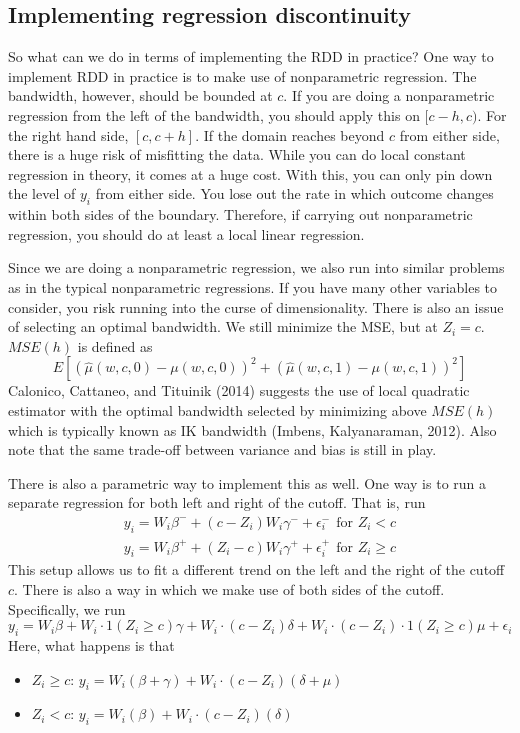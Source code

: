 \documentclass[12pt]{article}
\theoremstyle{definition}
\theoremstyle{property}
\theoremstyle{assumption}
\theoremstyle{example}
\theoremstyle{comment}
\begin{document}
\subsection{Implementing regression discontinuity}
So what can we do in terms of implementing the RDD in practice? One way to implement RDD in practice is to make use of nonparametric regression. The bandwidth, however, should be bounded at $c$. If you are doing a nonparametric regression from the left of the bandwidth, you should apply this on $[c-h, c)$. For the right hand side, $[c, c+h]$. If the domain reaches beyond $c$ from either side, there is a huge risk of misfitting the data. While you can do local constant regression in theory, it comes at a huge cost. With this, you can only pin down the level of $y_i$ from either side. You lose out the rate in which outcome changes within both sides of the boundary. Therefore, if carrying out nonparametric regression, you should do at least a local linear regression. \par
Since we are doing a nonparametric regression, we also run into similar problems as in the typical nonparametric regressions. If you have many other variables to consider, you risk running into the curse of dimensionality. There is also an issue of selecting an optimal bandwidth. We still minimize the MSE, but at $Z_i=c$.  $MSE(h)$ is defined as 
\[
E[(\hat{\mu}(w,c,0)-\mu(w,c,0))^2+(\hat{\mu}(w,c,1)-\mu(w,c,1))^2]
\]
Calonico, Cattaneo, and Tituinik (2014) suggests the use of local quadratic estimator with the optimal bandwidth selected by minimizing above $MSE(h)$ which is typically known as IK bandwidth (Imbens, Kalyanaraman, 2012). Also note that the same trade-off between variance and bias is still in play. \par
There is also a parametric way to implement this as well. One way is to run a separate regression for both left and right of the cutoff. That is, run
\begin{gather*}
y_i = W_i\beta^- +(c-Z_i)W_i\gamma^-+\epsilon_i^-\ \ \text{for }Z_i<c\\
y_i = W_i\beta^+ +(Z_i-c)W_i\gamma^++\epsilon_i^+\ \ \text{for }Z_i\geq c
\end{gather*}
This setup allows us to fit a different trend on the left and the right of the cutoff $c$. There is also a way in which we make use of both sides of the cutoff. Specifically, we run
\[
y_i = W_i\beta+ W_i \cdot 1(Z_i\geq c)\gamma+W_i\cdot(c-Z_i)\delta+W_i\cdot (c-Z_i)\cdot 1(Z_i\geq c) \mu +\epsilon_i
\]
Here, what happens is that
\begin{itemize}
\item $Z_i\geq c$: $y_i=W_i(\beta+\gamma)+W_i\cdot(c-Z_i)(\delta+\mu)$
\item $Z_i< c$: $y_i=W_i(\beta)+W_i\cdot(c-Z_i)(\delta)$
\end{itemize}
\end{document}
